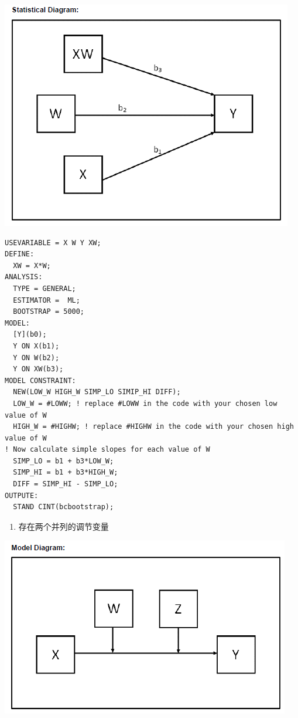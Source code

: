 \documentclass[
]{book}
\providecommand{\tightlist}{%
  \setlength{\itemsep}{0pt}\setlength{\parskip}{0pt}}
\begin{document}
\includegraphics{figs/1112.png}

\begin{verbatim}
USEVARIABLE = X W Y XW;
DEFINE:
  XW = X*W;
ANALYSIS:
  TYPE = GENERAL;
  ESTIMATOR =  ML;
  BOOTSTRAP = 5000;
MODEL:
  [Y](b0);
  Y ON X(b1);
  Y ON W(b2);
  Y ON XW(b3);
MODEL CONSTRAINT:
  NEW(LOW_W HIGH_W SIMP_LO SIMIP_HI DIFF);
  LOW_W = #LOWW; ! replace #LOWW in the code with your chosen low value of W
  HIGH_W = #HIGHW; ! replace #HIGHW in the code with your chosen high value of W
! Now calculate simple slopes for each value of W
  SIMP_LO = b1 + b3*LOW_W;
  SIMP_HI = b1 + b3*HIGH_W;
  DIFF = SIMP_HI - SIMP_LO;
OUTPUTE:
  STAND CINT(bcbootstrap);
\end{verbatim}

\begin{enumerate}
\def\labelenumi{\arabic{enumi}.}
\setcounter{enumi}{1}
\tightlist
\item
  存在两个并列的调节变量
\end{enumerate}

\includegraphics{figs/1113.png}
\end{document}
